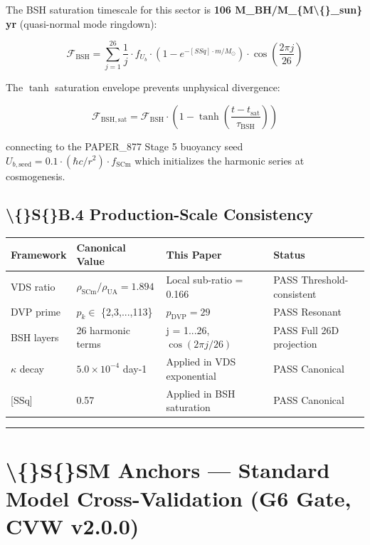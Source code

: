 \documentclass[11pt]{article}
\begin{document}
The BSH saturation timescale for this sector is \textbf{106 M\_BH/M\_\{M\textbackslash\{\}\_sun\} yr} (quasi-normal mode ringdown):

$$\mathcal{F}_{\mathrm{BSH}} = \sum_{j=1}^{26} \frac{1}{j} \cdot f_U_b \cdot \left(1 - e^{-[SSq] \cdot m/M_\odot}\right) \cdot \cos\!\left(\frac{2\pi j}{26}\right)$$

The $\tanh$ saturation envelope prevents unphysical divergence:

$$\mathcal{F}_{\mathrm{BSH,sat}} = \mathcal{F}_{\mathrm{BSH}} \cdot \left(1 - \tanh\!\left(\frac{t - t_{\mathrm{sat}}}{\tau_{\mathrm{BSH}}}\right)\right)$$

connecting to the PAPER\_877 Stage 5 buoyancy seed $U_{b,\mathrm{seed}} = 0.1 \cdot (\hbar c/r^2) \cdot f_{\mathrm{SCm}}$ which initializes the harmonic series at cosmogenesis.

\subsection*{\textbackslash\{\}S\{\}B.4 Production-Scale Consistency}

\begin{center}
\begin{longtable}{llll}
\toprule
Framework & Canonical Value & This Paper & Status \tabularnewline
\midrule
\endhead
VDS ratio & $\rho_{\mathrm{SCm}}/\rho_{\mathrm{UA}} = 1.894$ & Local sub-ratio = 0.166 & PASS Threshold-consistent \tabularnewline
DVP prime & $p_k \in$ \{2,3,...,113\} & $p_{\mathrm{DVP}} = 29$ & PASS Resonant \tabularnewline
BSH layers & 26 harmonic terms & j = 1...26, $\cos(2\pi j/26)$ & PASS Full 26D projection \tabularnewline
$\kappa$ decay & $5.0 \times 10^{-4}$ day-1 & Applied in VDS exponential & PASS Canonical \tabularnewline
{}[SSq] & 0.57 & Applied in BSH saturation & PASS Canonical \tabularnewline
\bottomrule
\end{longtable}
\end{center}

\noindent\rule{\textwidth}{0.4pt}

\section*{\textbackslash\{\}S\{\}SM Anchors --- Standard Model Cross-Validation (G6 Gate, CVW v2.0.0)}
\end{document}
